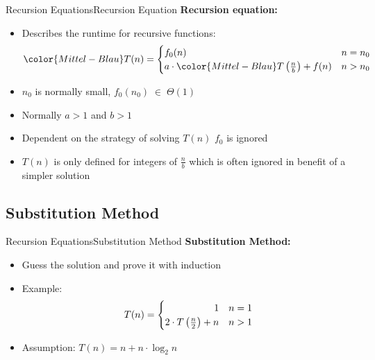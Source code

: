 
\begin{frame}{Recursion Equations}{Recursion Equation}
  \textbf{Recursion equation:}
  \begin{itemize}
    \item<2->
    Describes the runtime for recursive functions:
    \begin{displaymath}
    {\color{Mittel-Blau}T(n)} = \begin{cases}
      f_0(n) & n = n_0\\
      a \cdot {\color{Mittel-Blau}T\left(\frac{n}{b}\right)} + f(n) & n > n_0
    \end{cases}
    \end{displaymath}
    \item<3->
      {\color{Mittel-Blau}$n_0$} is normally small, {\color{Mittel-Blau}$f_0(n_0) \; \in \; \Theta(1)$}
    \item<4->
      Normally {\color{Mittel-Blau}$a > 1$} and {\color{Mittel-Blau}$b > 1$}
    \item<5->
      Dependent on the strategy of solving {\color{Mittel-Blau}$T(n)$}
      {\color{Mittel-Blau}$f_0$} is ignored
    \item<6->
      {\color{Mittel-Blau}$T(n)$} is only defined for integers of
      {\color{Mittel-Blau}$\frac{n}{b}$} which is often ignored in benefit of
      a simpler solution
  \end{itemize}
\end{frame}


\subsection{Substitution Method}

\begin{frame}{Recursion Equations}{Substitution Method}
  \textbf{Substitution Method:}
  \begin{itemize}
    \item<2->
      Guess the solution and prove it with induction
    \item<3->
      Example:        \color{Mittel-Blau}
      \begin{displaymath}
        T(n) = \begin{cases}
          \hfill 1 & n = 1\\
          2 \cdot T\left(\frac{n}{2}\right) + n & n > 1
        \end{cases}
      \end{displaymath}        \color{black}
    \item<4->
      Assumption:  {\color{Mittel-Blau}$T(n) = n + n \cdot \log_2 n$}
  \end{itemize}
\end{frame}

